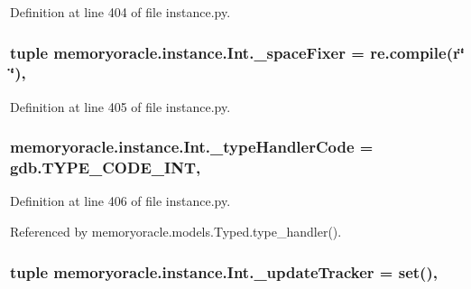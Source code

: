 Definition at line 404 of file instance.\+py.

\hypertarget{classmemoryoracle_1_1instance_1_1Int_af6f914a5e9c579d053807ef66fd53b80}{}
\subsubsection[{\+\_\+space\+Fixer}]{\setlength{\rightskip}{0pt plus 5cm}tuple memoryoracle.\+instance.\+Int.\+\_\+space\+Fixer = re.\+compile(r\char`\"{} \char`\"{})\hspace{0.3cm}{\ttfamily [static]}, {\ttfamily [private]}}\label{classmemoryoracle_1_1instance_1_1Int_af6f914a5e9c579d053807ef66fd53b80}


Definition at line 405 of file instance.\+py.

\hypertarget{classmemoryoracle_1_1instance_1_1Int_a2e5b022c97d7178ec6ea724a3ac7b828}{}
\subsubsection[{\+\_\+type\+Handler\+Code}]{\setlength{\rightskip}{0pt plus 5cm}memoryoracle.\+instance.\+Int.\+\_\+type\+Handler\+Code = gdb.\+T\+Y\+P\+E\+\_\+\+C\+O\+D\+E\+\_\+\+I\+N\+T\hspace{0.3cm}{\ttfamily [static]}, {\ttfamily [private]}}\label{classmemoryoracle_1_1instance_1_1Int_a2e5b022c97d7178ec6ea724a3ac7b828}


Definition at line 406 of file instance.\+py.



Referenced by memoryoracle.\+models.\+Typed.\+type\+\_\+handler().

\hypertarget{classmemoryoracle_1_1instance_1_1Int_ac2ea4b02c479861b9b5c6d371681a7c0}{}
\subsubsection[{\+\_\+update\+Tracker}]{\setlength{\rightskip}{0pt plus 5cm}tuple memoryoracle.\+instance.\+Int.\+\_\+update\+Tracker = set()\hspace{0.3cm}{\ttfamily [static]}, {\ttfamily [private]}}\label{classmemoryoracle_1_1instance_1_1Int_ac2ea4b02c479861b9b5c6d371681a7c0}



